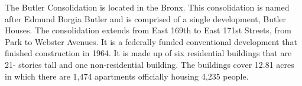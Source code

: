      

   

The Butler Consolidation is located in the Bronx. This consolidation is named after Edmund Borgia Butler and is comprised of a single development, Butler Houses. The consolidation extends from East 169th to East 171st Streets, from Park to Webster Avenues. It is a federally funded conventional development that finished construction in 1964. It is made up of six residential buildings that are 21- stories tall and one non-residential building. The buildings cover 12.81 acres in which there are 1,474 apartments officially housing 4,235 people. 